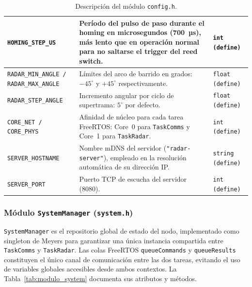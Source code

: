 \begin{table}[H]
{\begin{tabular}{|p{5cm}|p{9.5cm}|p{4cm}|p{3cm}|}
\hline
\texttt{HOMING\_STEP\_US} & Período del pulso de paso durante el homing en microsegundos (700~µs), más lento que en operación normal para no saltarse el trigger del reed switch. & \multicolumn{2}{l|}{\texttt{int (define)}} \\
\hline
\texttt{RADAR\_MIN\_ANGLE / RADAR\_MAX\_ANGLE} & Límites del arco de barrido en grados: $-45^\circ$ y $+45^\circ$ respectivamente. & \multicolumn{2}{l|}{\texttt{float (define)}} \\
\hline
\texttt{RADAR\_STEP\_ANGLE} & Incremento angular por ciclo de supertrama: $5^\circ$ por defecto. & \multicolumn{2}{l|}{\texttt{float (define)}} \\
\hline
\texttt{CORE\_NET / CORE\_PHYS} & Afinidad de núcleo para cada tarea FreeRTOS: Core~0 para \texttt{TaskComms} y Core~1 para \texttt{TaskRadar}. & \multicolumn{2}{l|}{\texttt{int (define)}} \\
\hline
\texttt{SERVER\_HOSTNAME} & Nombre mDNS del servidor (\texttt{"radar-server"}), empleado en la resolución automática de su dirección IP. & \multicolumn{2}{l|}{\texttt{string (define)}} \\
\hline
\texttt{SERVER\_PORT} & Puerto TCP de escucha del servidor (8080). & \multicolumn{2}{l|}{\texttt{int (define)}} \\
\hline
\end{tabular}
}
\vspace{6pt}
\caption{Descripción del módulo \texttt{config.h}.}
\label{tab:modulo_config}
\end{table}

\subsubsection*{Módulo \texttt{SystemManager} (\texttt{system.h})}

\texttt{SystemManager} es el repositorio global de estado del nodo, implementado como singleton de Meyers para garantizar una única instancia compartida entre \texttt{TaskComms} y \texttt{TaskRadar}. Las colas FreeRTOS \texttt{queueCommands} y \texttt{queueResults} constituyen el único canal de comunicación entre las dos tareas, evitando el uso de variables globales accesibles desde ambos contextos. La Tabla~\ref{tab:modulo_system} documenta sus atributos y métodos.

